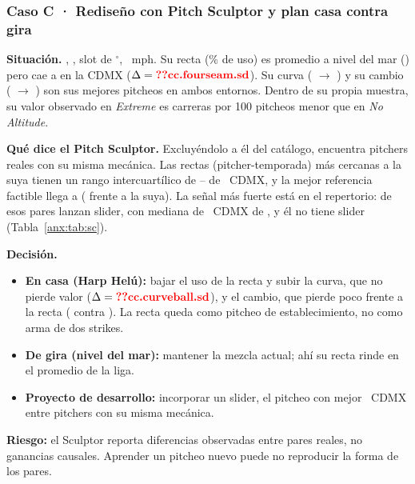 \subsubsection{Caso C · Rediseño con Pitch Sculptor y plan casa contra gira}

\textbf{Situación.} , , slot de $^\circ$, ~mph. Su recta (\% de uso) es promedio a nivel del mar () pero cae a  en la CDMX ($\Delta=\cf{cc.fourseam.sd}$). Su curva ( $\to$ ) y su cambio ( $\to$ ) son sus mejores pitcheos en ambos entornos. Dentro de su propia muestra, su valor observado en \emph{Extreme} es  carreras por 100 pitcheos menor que en \emph{No Altitude}.

\begin{table}[H]\centering\small
\caption{Caso C: arsenal .}\label{anx:tab:cc}
\end{table}

\textbf{Qué dice el Pitch Sculptor.} Excluyéndolo a él del catálogo, encuentra  pitchers reales con su misma mecánica. Las  rectas (pitcher-temporada) más cercanas a la suya tienen un rango intercuartílico de -- de \splus\ CDMX, y la mejor referencia factible llega a  ( frente a la suya). La señal más fuerte está en el repertorio:  de esos pares lanzan slider, con mediana de \splus\ CDMX de , y él no tiene slider (Tabla~\ref{anx:tab:sc}).

\begin{table}[H]\centering\small
\caption{Caso C: qué lanzan los pares factibles y cuánto rinde en la CDMX.}\label{anx:tab:sc}
\end{table}

\textbf{Decisión.}
\begin{itemize}
  \item \textbf{En casa (Harp Helú):} bajar el uso de la recta y subir la curva, que no pierde valor ($\Delta=\cf{cc.curveball.sd}$), y el cambio, que pierde poco frente a la recta ( contra ). La recta queda como pitcheo de establecimiento, no como arma de dos strikes.
  \item \textbf{De gira (nivel del mar):} mantener la mezcla actual; ahí su recta rinde en el promedio de la liga.
  \item \textbf{Proyecto de desarrollo:} incorporar un slider, el pitcheo con mejor \splus\ CDMX entre pitchers con su misma mecánica.
\end{itemize}
\textbf{Riesgo:} el Sculptor reporta diferencias observadas entre pares reales, no ganancias causales. Aprender un pitcheo nuevo puede no reproducir la forma de los pares.
